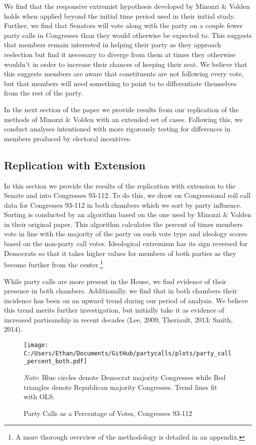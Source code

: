 \documentclass[12pt]{article}
\newcommand\fnote[1]{\captionsetup{font=small}\caption*{#1}}
\begin{document}
We find that the responsive extremist hypothesis developed by Minozzi \& Volden holds when applied beyond the initial time period used in their initial study. Further, we find that Senators will vote along with the party on a couple fewer party calls in Congresses than they would otherwise be expected to. This suggests that members remain interested in helping their party as they approach reelection but find it necessary to diverge from them at times they otherwise wouldn't in order to increase their chances of keeping their seat. We believe that this suggests members are aware that constituents are not following every vote, but that members will need something to point to to differentiate themselves from the rest of the party.

In the next section of the paper we provide results from our replication of the methods of Minozzi \& Volden with an extended set of cases. Following this, we conduct analyses intentioned with more rigorously testing for differences in members produced by electoral incentives.

\subsection{Replication with Extension}

In this section we provide the results of the replication with extension to the Senate and into Congresses 93-112. To do this, we draw on Congressional roll call data for Congresses 93-112 in both chambers which we sort by party influence. Sorting is conducted by an algorithm based on the one used by Minozzi \& Volden in their original paper. This algorithm calculates the percent of times members vote in line with the majority of the party on each vote type and ideology scores based on the non-party call votes. Ideological extremism has its sign reversed for Democrats so that it takes higher values for members of both parties as they become further from the center.\footnote{A more thorough overview of the methodology is detailed in an appendix.}

While party calls are more present in the House, we find evidence of their presence in both chambers. Additionally, we find that in both chambers their incidence has been on an upward trend during our period of analysis. We believe this trend merits further investigation, but initially take it as evidence of increased partisanship in recent decades (Lee, 2009; Theriault, 2013; Smith, 2014).


\begin{figure}[H]
	\centering
	\caption{Party Calls as a Percentage of Votes, Congresses 93-112}
	\texttt{[image: C:/Users/Ethan/Documents/GitHub/partycalls/plots/party\_call\_percent\_both.pdf]}
	\fnote{\textit{Note}: Blue circles denote Democrat majority Congresses while Red triangles denote Republican majority Congresses. Trend lines fit with OLS.}
\end{figure}
\end{document}
